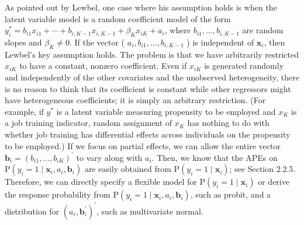 \documentclass[10pt]{article}
\begin{document}
As pointed out by Lewbel, one case where his assumption holds is when the latent variable model is a random coefficient model of the form $y_{i}^{*}=b_{i 1} x_{i 1}+\cdots+ b_{i, K-1} x_{i, K-1}+\beta_{K} x_{i K}+a_{i}$, where $b_{i 1}, \ldots, b_{i, K-1}$ are random slopes and $\beta_{K} \neq 0$. If the vector ( $a_{i}, b_{i 1}, \ldots, b_{i, K-1}$ ) is independent of $\mathbf{x}_{i}$, then Lewbel's key assumption holds. The problem is that we have arbitrarily restricted $x_{i K}$ to have a constant, nonzero coefficient. Even if $x_{i K}$ is generated randomly and independently of the other covariates and the unobserved heterogeneity, there is no reason to think that its coefficient is constant while other regressors might have heterogeneous coefficients; it is simply an arbitrary restriction. (For example, if $y^{*}$ is a latent variable measuring propensity to be employed and $x_{K}$ is a job training indicator, random assignment of $x_{K}$ has nothing to do with whether job training has differential effects across individuals on the propensity to be employed.) If we focus on partial effects, we can allow the entire vector $\mathbf{b}_{i}=\left(b_{i 1}, \ldots, b_{i K}\right)^{\prime}$ to vary along with $a_{i}$. Then, we know that the APEs on\\
$\mathrm{P}\left(y_{i}=1 \mid \mathbf{x}_{i}, a_{i}, \mathbf{b}_{i}\right)$ are easily obtained from $\mathrm{P}\left(y_{i}=1 \mid \mathbf{x}_{i}\right)$; see Section 2.2.5. Therefore, we can directly specify a flexible model for $\mathrm{P}\left(y_{i}=1 \mid \mathbf{x}_{i}\right)$ or derive the response probability from $\mathrm{P}\left(y_{i}=1 \mid \mathbf{x}_{i}, a_{i}, \mathbf{b}_{i}\right)$, such as probit, and a distribution for $\left(a_{i}, \mathbf{b}_{i}^{\prime}\right)^{\prime}$, such as multivariate normal.
\end{document}
